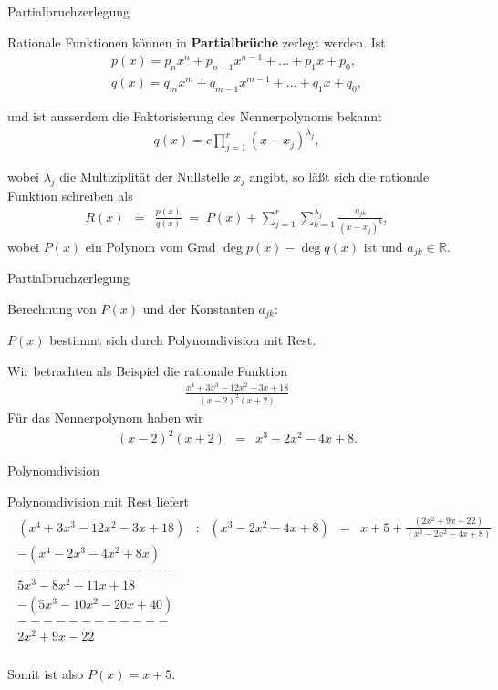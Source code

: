 \documentclass[german]{beamer}
\newcommand{\bq}{\begin{eqnarray*}}
\newcommand{\eq}{\end{eqnarray*}}
\begin{document}
\begin{frame}{Partialbruchzerlegung}

Rationale Funktionen k\"onnen in {\bf Partialbr\"uche} zerlegt werden.
Ist 
{\footnotesize
\bq
 p(x) = p_n x^n + p_{n-1} x^{n-1} + ... + p_1 x + p_0,
 \nonumber \\
 q(x) = q_m x^m + q_{m-1} x^{m-1} + ... + q_1 x + q_0,
\eq
}

\vspace*{-4mm}
und ist ausserdem die Faktorisierung des Nennerpolynoms bekannt
{\footnotesize
\bq
 q(x) = c \prod\limits_{j=1}^r \left( x - x_j \right)^{\lambda_j},
\eq
}

\vspace*{-3mm}
wobei $\lambda_j$ die Multiziplit\"at der Nullstelle $x_j$ angibt, 
so l\"a{\ss}t sich die rationale Funktion
schreiben als
\bq
 R(x) & = & \frac{p(x)}{q(x)}
 \; = \;
 P(x) + \sum\limits_{j=1}^r \sum\limits_{k=1}^{\lambda_j} \frac{a_{jk}}{(x-x_j)^k},
\eq
wobei $P(x)$ ein Polynom vom Grad $\deg p(x) - \deg q(x)$ ist und $a_{jk}\in \mathbb R$.

\end{frame}

\begin{frame}{Partialbruchzerlegung}

Berechnung von $P(x)$ und der Konstanten $a_{jk}$:

\vspace*{5mm}
$P(x)$ bestimmt sich durch Polynomdivision mit Rest.

\vspace*{5mm}
Wir betrachten als Beispiel die rationale Funktion
\bq
\frac{x^4+3x^3-12x^2-3x+18}{(x-2)^2(x+2)}
\eq
F\"ur das Nennerpolynom haben wir
\bq
 (x-2)^2(x+2) & = & x^3 - 2 x^2 - 4 x + 8.
\eq

\end{frame}

\begin{frame}{Polynomdivision}

Polynomdivision mit Rest liefert
{\scriptsize
\bq
\begin{array}{rcrcl}
(x^4+3x^3-12x^2-3x+18) & : & (x^3 - 2 x^2 - 4 x + 8) & = & x + 5 + \frac{(2x^2+9x-22)}{(x^3-2x^2-4x+8)} \\
-(x^4-2x^3-4x^2+8x) & & & & \\
-------------& & & & \\
5x^3-8x^2-11x+18 & & & & \\
-(5x^3-10x^2-20x+40) & & & & \\
------------ & & & & \\
2x^2+9x-22 & & & & \\
\end{array}
\eq
}

Somit ist also $P(x)=x+5$. 


\end{frame}
\end{document}
